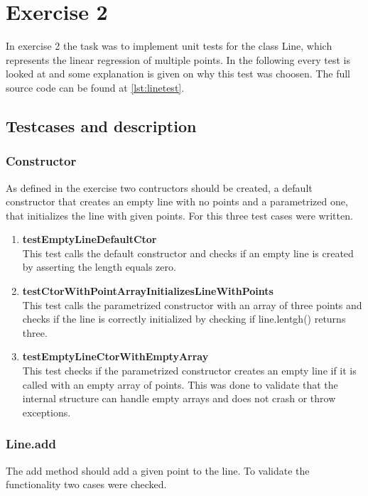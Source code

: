 \chapter{Exercise 2}
In exercise 2 the task was to implement unit tests for the class Line, which represents the linear regression of multiple points. In the following every test is looked at and some explanation is given on why this test was choosen. The full source code can be found at \ref{lst:linetest}.

\section{Testcases and description}

\subsection{Constructor}
As defined in the exercise two contructors should be created, a default constructor that creates an empty line with no points and a parametrized one, that initializes the line with given points. For this three test cases were written.

\begin{enumerate}
    \item \textbf{testEmptyLineDefaultCtor} \\
    This test calls the default constructor and checks if an empty line is created by asserting the length equals zero.
    \item \textbf{testCtorWithPointArrayInitializesLineWithPoints} \\
    This test calls the parametrized constructor with an array of three points and checks if the line is correctly initialized by checking if line.lentgh() returns three.
    \item \textbf{testEmptyLineCtorWithEmptyArray} \\
    This test checks if the parametrized constructor creates an empty line if it is called with an empty array of points. This was done to validate that the internal structure can handle empty arrays and does not crash or throw exceptions.
\end{enumerate}

\subsection{Line.add}
The add method should add a given point to the line. To validate the functionality two cases were checked.

